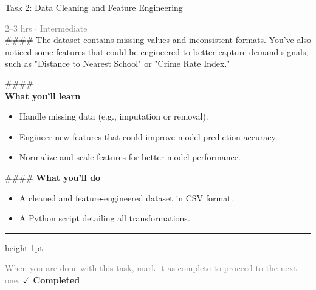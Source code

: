 \documentclass[10pt,a4paper]{article}
\begin{document}
\begin{taskbox}{Task 2: Data Cleaning and Feature Engineering}

    {\small \textcolor{gray}{2--3 hrs $\cdot$ Intermediate}}\\[12pt]

    \#\#\#\# 
The dataset contains missing values and inconsistent formats. You’ve also noticed some features that could be engineered to better capture demand signals, such as "Distance to Nearest School" or "Crime Rate Index."

\#\#\#\# \\[10pt]
\vspace{8pt}
{\large \textbf{\textcolor{brandLight}{What you'll learn}}}\\[4pt]
\begin{itemize}
    \item Handle missing data (e.g., imputation or removal).
    \item Engineer new features that could improve model prediction accuracy.
    \item Normalize and scale features for better model performance.
\end{itemize}

\#\#\#\# \vspace{8pt}
{\large \textbf{\textcolor{brandLight}{What you'll do}}}\\[4pt]
\begin{itemize}
    \item A cleaned and feature-engineered dataset in CSV format.
    \item A Python script detailing all transformations.\par
\end{itemize}

    \vspace{16pt}

    \textcolor{cardBorder}{\hrule height 1pt}\vspace{8pt}

    \small \textcolor{gray}{When you are done with this task, mark it as complete to proceed to the next one.} \hfill \textbf{\textcolor{brandDark}{$\checkmark$ Completed}}

\end{taskbox}
\end{document}
